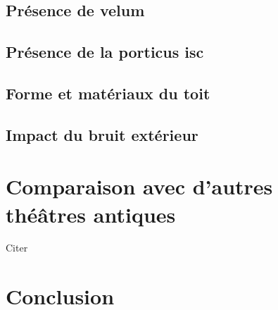 \section{Présence de velum}
\section{Présence de la \gls{porticus isc}}
\section{Forme et matériaux du toit}
\section{Impact du bruit extérieur}

\newpage

\chapter{Comparaison avec d'autres théâtres antiques}
\minitoc
\newpage

Citer  \cite[p.25]{rindel}

\chapter*{Conclusion}

\newpage

 
 
